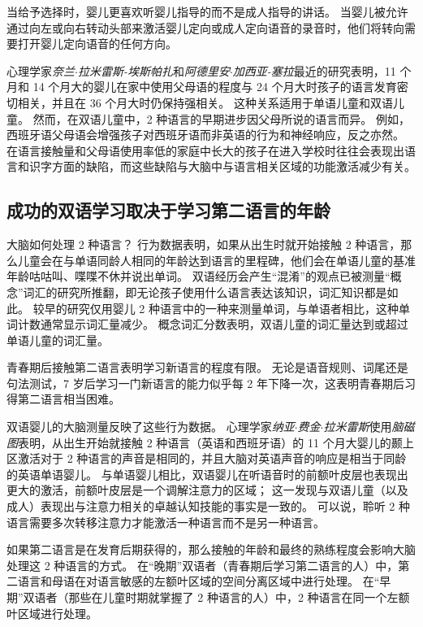 当给予选择时，婴儿更喜欢听婴儿指导的而不是成人指导的讲话。
当婴儿被允许通过向左或向右转动头部来激活婴儿定向或成人定向语音的录音时，他们将转向需要打开婴儿定向语音的任何方向。


心理学家\textit{奈兰$\cdot$拉米雷斯-埃斯帕扎}和\textit{阿德里安$\cdot$加西亚-塞拉}最近的研究表明，11 个月和 14 个月大的婴儿在家中使用父母语的程度与 24 个月大时孩子的语言发育密切相关，并且在 36 个月大时仍保持强相关。
这种关系适用于单语儿童和双语儿童。
然而，在双语儿童中，2 种语言的早期进步因父母所说的语言而异。
例如，西班牙语父母语会增强孩子对西班牙语而非英语的行为和神经响应，反之亦然。
在语言接触量和父母语使用率低的家庭中长大的孩子在进入学校时往往会表现出语言和识字方面的缺陷，而这些缺陷与大脑中与语言相关区域的功能激活减少有关。



\subsection{成功的双语学习取决于学习第二语言的年龄}

大脑如何处理 2 种语言？
行为数据表明，如果从出生时就开始接触 2 种语言，那么儿童会在与单语同龄人相同的年龄达到语言的里程碑，他们会在单语儿童的基准年龄咕咕叫、喋喋不休并说出单词。
双语经历会产生“混淆”的观点已被测量“概念”词汇的研究所推翻，即无论孩子使用什么语言表达该知识，词汇知识都是如此。
较早的研究仅用婴儿 2 种语言中的一种来测量单词，与单语者相比，这种单词计数通常显示词汇量减少。
概念词汇分数表明，双语儿童的词汇量达到或超过单语儿童的词汇量。


青春期后接触第二语言表明学习新语言的程度有限。
无论是语音规则、词尾还是句法测试，7 岁后学习一门新语言的能力似乎每 2 年下降一次，这表明青春期后习得第二语言相当困难。


双语婴儿的大脑测量反映了这些行为数据。
心理学家\textit{纳亚$\cdot$费金$\cdot$拉米雷斯}使用\textit{脑磁图}表明，从出生开始就接触 2 种语言（英语和西班牙语）的 11 个月大婴儿的颞上区激活对于 2 种语言的声音是相同的，并且大脑对英语声音的响应是相当于同龄的英语单语婴儿。
与单语婴儿相比，双语婴儿在听语音时的前额叶皮层也表现出更大的激活，前额叶皮层是一个调解注意力的区域；
这一发现与双语儿童（以及成人）表现出与注意力相关的卓越认知技能的事实是一致的。
可以说，聆听 2 种语言需要多次转移注意力才能激活一种语言而不是另一种语言。


如果第二语言是在发育后期获得的，那么接触的年龄和最终的熟练程度会影响大脑处理这 2 种语言的方式。
在“晚期”双语者（青春期后学习第二语言的人）中，第二语言和母语在对语言敏感的左额叶区域的空间分离区域中进行处理。
在“早期”双语者（那些在儿童时期就掌握了 2 种语言的人）中，2 种语言在同一个左额叶区域进行处理。



